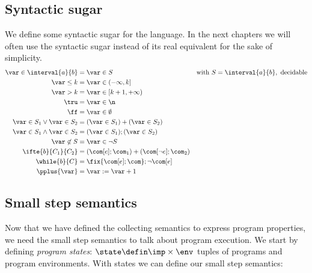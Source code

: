 \subsection{Syntactic sugar}\label{sub:sugar}
We define some syntactic sugar for the language. In the next chapters
we will often use the syntactic sugar instead of its real equivalent
for the sake of simplicity.
% 
%
\begin{align*}
  \var \in \interval{a}{b} & = \var \in S & \text{with } S = \interval{a}{b}, \text{ decidable}\\
  \var \leq k & = \var \in (-\infty, k]\\
  \var > k & = \var \in [k+1, + \infty) \\
  \tru & = \var \in \n \\
  \ff & = \var \in \emptyset \\
  \var \in S_1 \vee \var \in S_2 & = (\var \in S_1) + (\var \in S_2) \\ 
  \var \in S_1 \wedge \var \in S_2 & = (\var \in S_1);(\var \in S_2) \\
  \var \not\in S & = \var \in \neg S \\
  \ifte{b}{C_1}{C_2} & = (\com[e];\com_1) + (\com[\neg e];\com_2) \\
  \while{b}{C} & = \fix{\com[e];\com};\neg\com[e] \\
  \pplus{\var} & = \var := \var + 1
\end{align*}

\subsection{Small step semantics}\label{sub:sos}

Now that we have defined the collecting semantics to express program
properties, we need the small step semantics to talk about program
execution. We start by defining \emph{program states}:
\(\state \defin \imp \times \env\) tuples of programs and program
environments.  With states we can define our small step semantics:


